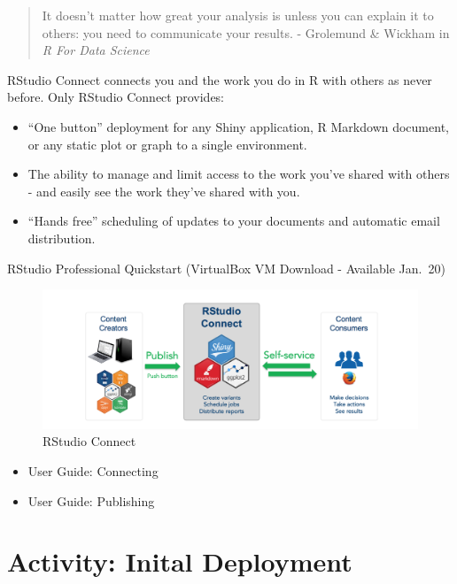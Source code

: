 \documentclass[]{book}
\providecommand{\tightlist}{%
  \setlength{\itemsep}{0pt}\setlength{\parskip}{0pt}}
\theoremstyle{definition}
\theoremstyle{definition}
\theoremstyle{definition}
\theoremstyle{remark}
\begin{document}
\begin{quote}
It doesn't matter how great your analysis is unless you can explain it
to others: you need to communicate your results. - Grolemund \& Wickham
in \emph{R For Data Science}
\end{quote}

RStudio Connect connects you and the work you do in R with others as
never before. Only RStudio Connect provides:

\begin{itemize}
\tightlist
\item
  ``One button'' deployment for any Shiny application, R Markdown
  document, or any static plot or graph to a single environment.
\item
  The ability to manage and limit access to the work you've shared with
  others - and easily see the work they've shared with you.
\item
  ``Hands free'' scheduling of updates to your documents and automatic
  email distribution.
\end{itemize}

RStudio Professional Quickstart (VirtualBox VM Download - Available
Jan.~20)

\begin{figure}
\centering
\includegraphics{imgs/deployment/explain-connect.png}
\caption{RStudio Connect}
\end{figure}

\begin{itemize}
\tightlist
\item
  User Guide: Connecting
\item
  User Guide: Publishing
\end{itemize}

\hypertarget{activity-inital-deployment}{%
\section{Activity: Inital Deployment}\label{activity-inital-deployment}}
\end{document}
